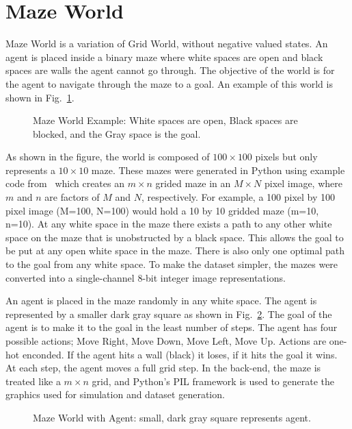 \documentclass[12pt,american]{report}
\begin{document}
\section{Maze World}
\label{sec:dataset}
Maze World is a variation of Grid World, without negative valued states.  An agent is placed inside a binary maze where white spaces are open and black spaces are walls the agent cannot go through.  The objective of the world is for the agent to navigate through the maze to a goal.  An example of this world is shown in Fig.~\ref{fig:maze_world_example}.
\begin{figure}
\centering
\setlength{\fboxsep}{0pt}%
\caption{Maze World Example: White spaces are open, Black spaces are blocked, and the Gray space is the goal.}
\label{fig:maze_world_example}
\end{figure}
As shown in the figure, the world is composed of $100\times 100$ pixels but only represents a $10\times 10$ maze.  These mazes were generated in Python using example code from~\cite{maze_code} which creates an $m\times n$ grided maze in an $M\times N$ pixel image, where $m$ and $n$ are factors of $M$ and $N$, respectively. For example, a 100 pixel by 100 pixel image (M=100, N=100) would hold a 10 by 10 gridded maze (m=10, n=10). At any white space in the maze there exists a path to any other white space on the maze that is unobstructed by a black space.  This allows the goal to be put at any open white space in the maze.  There is also only one optimal path to the goal from any white space. To make the dataset simpler, the mazes were converted into a single-channel 8-bit integer image representations.  

An agent is placed in the maze randomly in any white space.  The agent is represented by a smaller dark gray square as shown in Fig.~\ref{fig:maze_with_agent}. The goal of the agent is to make it to the goal in the least number of steps.  The agent has four possible actions; Move Right, Move Down, Move Left, Move Up. Actions are one-hot enconded. If the agent hits a wall (black) it loses, if it hits the goal it wins. At each step, the agent moves a full grid step.  In the back-end, the maze is treated like a $m\times n$ grid, and Python's PIL framework is used to generate the graphics used for simulation and dataset generation.
\begin{figure}
\centering
\setlength{\fboxsep}{0pt}%
\caption{Maze World with Agent: small, dark gray square represents agent.}
\label{fig:maze_with_agent}
\end{figure}
\end{document}
